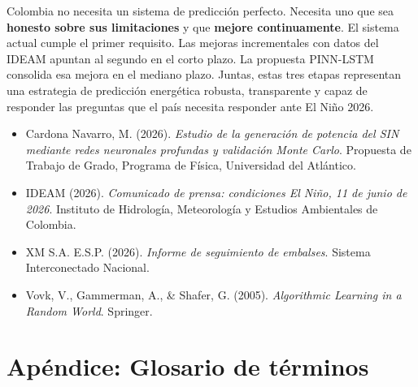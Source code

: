 \documentclass[11pt,a4paper]{article}
\begin{document}
\begin{alertbox}
Colombia no necesita un sistema de predicción perfecto. Necesita uno que sea \textbf{honesto sobre sus limitaciones} y que \textbf{mejore continuamente}. El sistema actual cumple el primer requisito. Las mejoras incrementales con datos del IDEAM apuntan al segundo en el corto plazo. La propuesta PINN-LSTM consolida esa mejora en el mediano plazo. Juntas, estas tres etapas representan una estrategia de predicción energética robusta, transparente y capaz de responder las preguntas que el país necesita responder ante El Niño 2026.
\end{alertbox}

\vspace{5mm}


\begin{small}
\begin{itemize}[leftmargin=*,noitemsep]
\item Cardona Navarro, M. (2026). \textit{Estudio de la generación de potencia del SIN mediante redes neuronales profundas y validación Monte Carlo}. Propuesta de Trabajo de Grado, Programa de Física, Universidad del Atlántico.
\item IDEAM (2026). \textit{Comunicado de prensa: condiciones El Niño, 11 de junio de 2026}. Instituto de Hidrología, Meteorología y Estudios Ambientales de Colombia.
\item XM S.A. E.S.P. (2026). \textit{Informe de seguimiento de embalses}. Sistema Interconectado Nacional.
\item Vovk, V., Gammerman, A., \& Shafer, G. (2005). \textit{Algorithmic Learning in a Random World}. Springer.
\end{itemize}
\end{small}

\section*{Apéndice: Glosario de términos}
\end{document}
